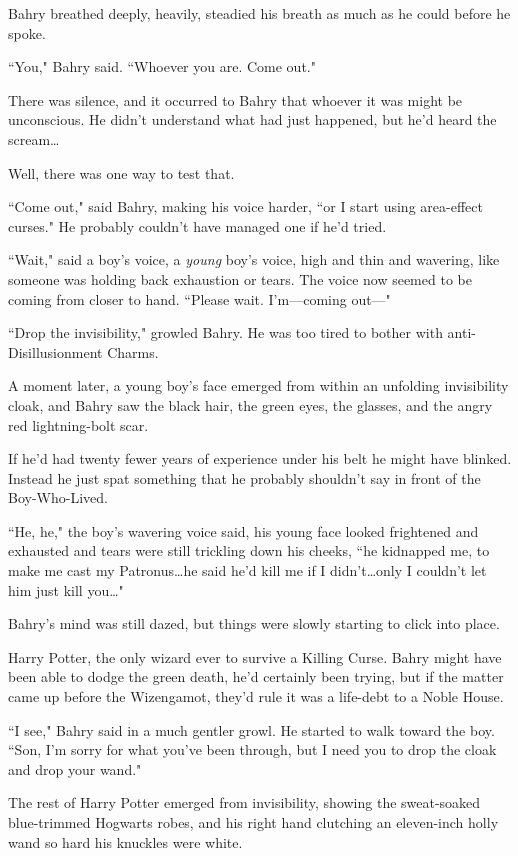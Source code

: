 Bahry breathed deeply, heavily, steadied his breath as much as he could before he spoke.

``You," Bahry said. ``Whoever you are. Come out."

There was silence, and it occurred to Bahry that whoever it was might be unconscious. He didn't understand what had just happened, but he'd heard the scream…

Well, there was one way to test that.

``Come out," said Bahry, making his voice harder, ``or I start using area-effect curses." He probably couldn't have managed one if he'd tried.

``Wait," said a boy's voice, a \emph{young} boy's voice, high and thin and wavering, like someone was holding back exhaustion or tears. The voice now seemed to be coming from closer to hand. ``Please wait. I'm—coming out—"

``Drop the invisibility," growled Bahry. He was too tired to bother with anti-Disillusionment Charms.

A moment later, a young boy's face emerged from within an unfolding invisibility cloak, and Bahry saw the black hair, the green eyes, the glasses, and the angry red lightning-bolt scar.

If he'd had twenty fewer years of experience under his belt he might have blinked. Instead he just spat something that he probably shouldn't say in front of the Boy-Who-Lived.

``He, he," the boy's wavering voice said, his young face looked frightened and exhausted and tears were still trickling down his cheeks, ``he kidnapped me, to make me cast my Patronus…he said he'd kill me if I didn't…only I couldn't let him just kill you…"

Bahry's mind was still dazed, but things were slowly starting to click into place.

Harry Potter, the only wizard ever to survive a Killing Curse. Bahry might have been able to dodge the green death, he'd certainly been trying, but if the matter came up before the Wizengamot, they'd rule it was a life-debt to a Noble House.

``I see," Bahry said in a much gentler growl. He started to walk toward the boy. ``Son, I'm sorry for what you've been through, but I need you to drop the cloak and drop your wand."

The rest of Harry Potter emerged from invisibility, showing the sweat-soaked blue-trimmed Hogwarts robes, and his right hand clutching an eleven-inch holly wand so hard his knuckles were white.

